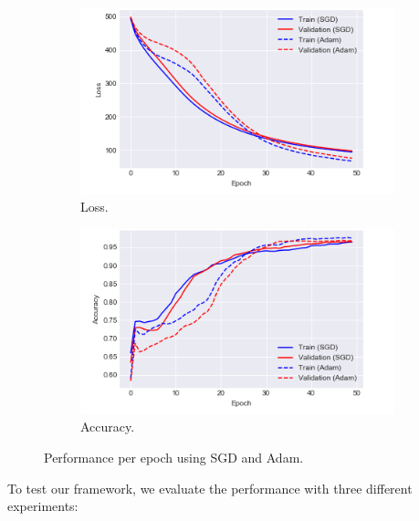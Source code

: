 \documentclass[10pt,conference,compsocconf]{IEEEtran}
\begin{document}
        \begin{figure}[t]
        \centering
        \begin{subfigure}{0.45\linewidth}
            \centering
            \includegraphics[width=\textwidth]{figures/adamsgdloss.png}
            \caption{Loss.}
            \label{fig:adamsgdloss}
             \end{subfigure}%
            \begin{subfigure}{0.45\linewidth}
            \centering
            \includegraphics[width=\textwidth]{figures/adamsgdaccuracy.png}
            \caption{Accuracy.}
            \label{fig:adamsgdaccuracy}
             \end{subfigure}
             \caption{Performance per epoch using SGD and Adam.}
            \label{fig:perf_optim}
             
        \end{figure}
        To test our framework, we evaluate the performance with three different experiments:
        
\end{document}
